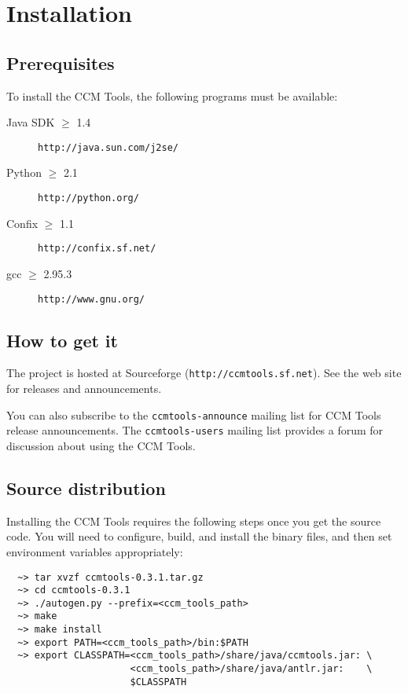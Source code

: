 
\chapter{Installation}

\section{Prerequisites}

To install the CCM Tools, the following programs must be available:
\begin{description}
\item [Java SDK $\ge$ 1.4] {\tt http://java.sun.com/j2se/}
\item [Python $\ge$ 2.1] {\tt http://python.org/}
\item [Confix $\ge$ 1.1] {\tt http://confix.sf.net/}
\item [gcc $\ge$ 2.95.3] {\tt http://www.gnu.org/}
\end{description}

\section{How to get it}

The project is hosted at Sourceforge ({\tt http://ccmtools.sf.net}). See the web
site for releases and announcements.

You can also subscribe to the {\tt ccmtools-announce} mailing list for CCM Tools
release announcements. The {\tt ccmtools-users} mailing list provides a forum
for discussion about using the CCM Tools.

\section{Source distribution}

Installing the CCM Tools requires the following steps once you get the source
code. You will need to configure, build, and install the binary files, and then
set environment variables appropriately:
\begin{small}
\begin{verbatim}
  ~> tar xvzf ccmtools-0.3.1.tar.gz
  ~> cd ccmtools-0.3.1
  ~> ./autogen.py --prefix=<ccm_tools_path>
  ~> make
  ~> make install
  ~> export PATH=<ccm_tools_path>/bin:$PATH
  ~> export CLASSPATH=<ccm_tools_path>/share/java/ccmtools.jar: \
                      <ccm_tools_path>/share/java/antlr.jar:    \
                      $CLASSPATH
\end{verbatim}
\end{small}

